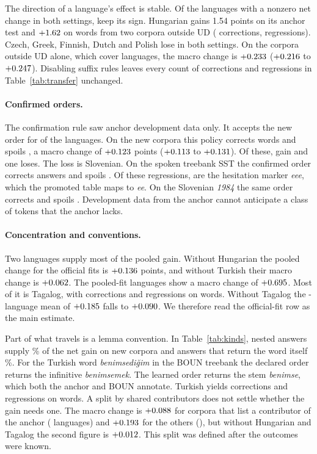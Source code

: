 \documentclass[11pt]{article}
\begin{document}
The direction of a language's effect is stable. Of the \trBothSign{} languages
with a nonzero net change in both settings, \trSameSign{} keep its sign.
Hungarian gains 1.54 points on its anchor test and \(+1.62\) on
\trHunN{} words from two corpora outside UD (\trHunCorr{} corrections,
\trHunReg{} regressions). Czech, Greek, Finnish, Dutch and Polish lose in
both settings. On
the \trOutsideCorpora{} corpora outside UD alone, which cover \trOutLang{}
languages, the macro change is \(+0.233\) (\(+0.216\) to \(+0.247\)).
Disabling suffix rules leaves every count of corrections and regressions in
Table~\ref{tab:transfer} unchanged.

\paragraph{Confirmed orders.}
The confirmation rule saw anchor development data only. It accepts the new
order for \trAccepted{} of the \trOffLang{} languages. On the new corpora this
policy corrects \trOffGateCorr{} words and spoils \trOffGateReg{}, a macro
change of \(+0.123\) points (\(+0.113\) to \(+0.131\)).
Of these, \trOffGateUp{} gain and one loses. The loss is Slovenian. On the
spoken treebank SST the confirmed order corrects \trSstCorr{} answers and
spoils \trSstReg. Of these regressions, \trSlvEee{} are the hesitation marker
\emph{eee}, which the promoted table maps to \emph{ee}. On the Slovenian
\emph{1984} the same order corrects \trSlMteCorr{} and spoils \trSlMteReg.
Development data from the anchor cannot anticipate a class of tokens that
the anchor lacks.

\paragraph{Concentration and conventions.}
Two languages supply most of the pooled gain. Without Hungarian the pooled
change for the official fits is \(+0.136\) points, and without
Turkish their macro change is \(+0.062\). The \trPoolLang{}
pooled-fit languages show a macro change of \(+0.695\). Most of it is
Tagalog, with \trTglCorr{} corrections and \trTglReg{} regressions on
\trTglN{} words. Without Tagalog the \trLang-language mean of \(+0.185\)
falls to \(+0.090\). We therefore read the official-fit row as the
main estimate.

Part of what travels is a lemma convention. In Table~\ref{tab:kinds},
nested answers supply \atNestedShare\% of the net gain on new corpora and
answers that return the word itself \atCopyShare\%. For the Turkish word
\emph{benimsedi\u{g}im} in the BOUN treebank the declared order returns the
infinitive \emph{benimsemek}. The learned order returns the stem
\emph{benimse}, which both the anchor and BOUN annotate. Turkish yields
\trTurCorr{} corrections and \trTurReg{} regressions on \trTurN{} words.
A split by shared contributors does not settle whether the gain needs one.
The macro change is \(+0.088\) for corpora that list a contributor of
the anchor (\trTeamLang{} languages) and \(+0.193\) for the others
(\trOtherLang), but without Hungarian and Tagalog the second figure is
\(+0.012\). This split was defined after the outcomes were known.
\end{document}
